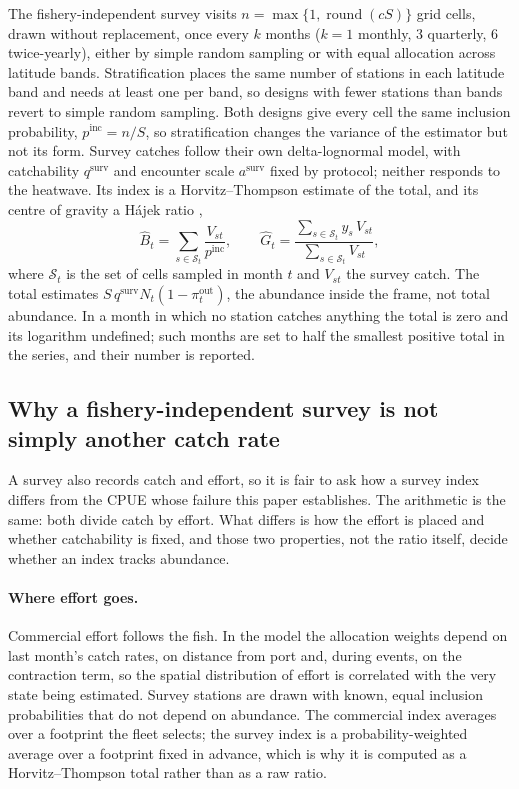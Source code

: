 \documentclass[11pt,a4paper]{article}
\newcommand{\vt}[1]{\text{#1}}
\begin{document}
The fishery-independent survey visits $n=\max\{1,\operatorname{round}(cS)\}$ grid cells, drawn without replacement, once every $k$ months ($k=1$ monthly, 3 quarterly, 6 twice-yearly), either by simple random sampling or with equal allocation across latitude bands. Stratification places the same number of stations in each latitude band and needs at least one per band, so designs with fewer stations than bands revert to simple random sampling. Both designs give every cell the same inclusion probability, $p^{\vt{inc}} = n/S$, so stratification changes the variance of the estimator but not its form. Survey catches follow their own delta-lognormal model, with catchability $q^{\vt{surv}}$ and encounter scale $a^{\vt{surv}}$ fixed by protocol; neither responds to the heatwave. Its index is a Horvitz--Thompson estimate of the total, and its centre of gravity a Hájek ratio \citep{horvitz1952,sarndal1992},
\begin{equation}
\widehat B_t = \sum_{s\in\mathcal S_t}\frac{V_{st}}{p^{\vt{inc}}}, \qquad \widehat G_t = \frac{\sum_{s\in\mathcal S_t} y_s\,V_{st}}{\sum_{s\in\mathcal S_t}V_{st}},
\label{eq:survey}
\end{equation}
where $\mathcal S_t$ is the set of cells sampled in month $t$ and $V_{st}$ the survey catch. The total estimates $S\,q^{\vt{surv}}N_t(1-\pi^{\vt{out}}_t)$, the abundance inside the frame, not total abundance. In a month in which no station catches anything the total is zero and its logarithm undefined; such months are set to half the smallest positive total in the series, and their number is reported.

\subsection{Why a fishery-independent survey is not simply another catch rate}
\label{sec:why-survey}

A survey also records catch and effort, so it is fair to ask how a survey index differs from the CPUE whose failure this paper establishes. The arithmetic is the same: both divide catch by effort. What differs is how the effort is placed and whether catchability is fixed, and those two properties, not the ratio itself, decide whether an index tracks abundance.

\paragraph{Where effort goes.} Commercial effort follows the fish. In the model the allocation weights depend on last month's catch rates, on distance from port and, during events, on the contraction term, so the spatial distribution of effort is correlated with the very state being estimated. Survey stations are drawn with known, equal inclusion probabilities that do not depend on abundance. The commercial index averages over a footprint the fleet selects; the survey index is a probability-weighted average over a footprint fixed in advance, which is why it is computed as a Horvitz--Thompson total rather than as a raw ratio.
\end{document}
